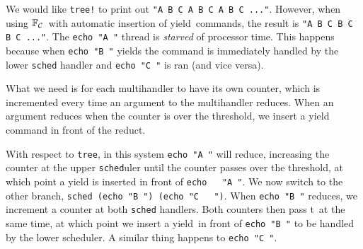 \documentclass[msc,deptreport,cs]{infthesis} %
\newcommand{\code}[1]{\lstinline{#1}}
\newcommand\countingfrank{$\mathbb{F}_{\cal{C}}$}
\newcommand{\threshc}{{\color{blue} \textsf{t}}}
\newcommand\yield{\textsf{yield}\xspace}
\newcommand{\todo}[1]
           {{\par\noindent\small\color{RoyalPurple}
  \framebox{\parbox{\dimexpr\linewidth-2\fboxsep-2\fboxrule}
    {\textbf{TODO:} #1}}}}
\begin{document}
We would like \code{tree!} to print out \code{"A B C A B C A B C ..."}. However, when
using \countingfrank~with automatic insertion of \yield~commands, the result is
\code{"A B C B C B C ..."}. The \code{echo "A "} thread is \emph{starved} of
processor time. This happens because when \code{echo "B "} yields the command
is immediately handled by the lower \code{sched} handler and \code{echo "C "}
is ran (and vice versa).

What we need is for each multihandler to have its own counter, which is
incremented every time an argument to the multihandler reduces. When an argument
reduces when the counter is over the threshold, we insert a \yield command in
front of the reduct.

With respect to \code{tree}, in this system \code{echo "A "} will reduce,
increasing the counter at the upper \code{sched}uler until the counter passes
over the threshold, at which point a \yield is inserted in front of \code{echo
  "A "}. We now switch to the other branch, \code{sched (echo "B ") (echo "C
  ")}. When \code{echo "B "} reduces, we increment a counter at both
\code{sched} handlers. Both counters then pass \threshc~at the same time, at
which point we insert a \yield~in front of \code{echo "B "} to be handled by the
lower scheduler. A similar thing happens to \code{echo "C "}.

\todo{Finish this!}
\end{document}
